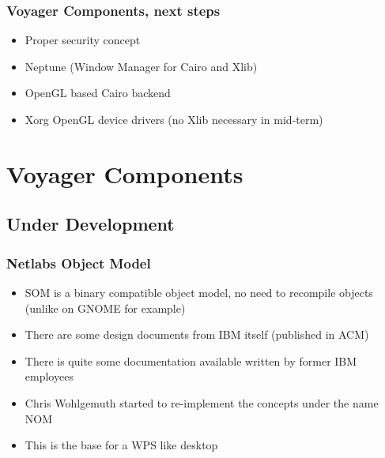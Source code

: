 \documentclass{beamer}
\begin{document}
\begin{frame}
\frametitle{Voyager Components, next steps}
\begin{itemize}[<+->]
  \item Proper security concept
  \item Neptune (Window Manager for Cairo and Xlib)
  \item OpenGL based Cairo backend
  \item Xorg OpenGL device drivers (no Xlib necessary in mid-term)
\end{itemize}
\end{frame}

\section{Voyager Components}
\subsection{Under Development}

\begin{frame}
\frametitle{Netlabs Object Model}
\begin{itemize}[<+->]
  \item SOM is a binary compatible object model, no need to recompile objects (unlike on GNOME for example)
  \item There are some design documents from IBM itself (published in ACM)
  \item There is quite some documentation available written by former IBM employees
  \item Chris Wohlgemuth started to re-implement the concepts under the name NOM
  \item This is the base for a WPS like desktop
\end{itemize}
\end{frame}
\end{document}
